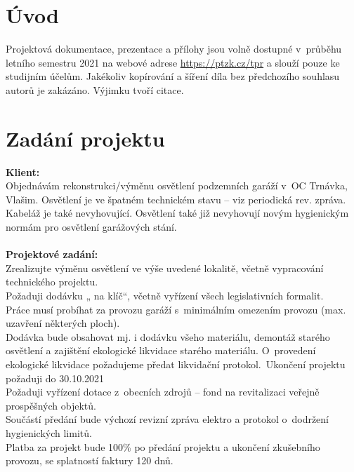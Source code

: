 \documentclass[a4paper, twoside, 11pt]{article}
\begin{document}
\newpage

\setcounter{page}{2}%

\newpage
\tableofcontents
\flushbottom %
\newpage
\vspace{0pt}
\listoffigures %
\listoftables
\flushbottom
\newpage

\setcounter{page}{1}

\section{Úvod}
	Projektová dokumentace, prezentace a přílohy jsou volně dostupné v~průběhu  letního semestru 2021 na webové adrese \url{https://ptzk.cz/tpr} a slouží pouze ke studijním účelům. Jakékoliv kopírování a šíření díla bez předchozího souhlasu autorů je zakázáno. Výjimku tvoří citace.
	
	\section{Zadání projektu}
	\textbf{Klient:}\\
		Objednávám rekonstrukci/výměnu osvětlení podzemních garáží v~OC Trnávka, Vlašim. Osvětlení je ve špatném technickém stavu – viz periodická rev. zpráva. Kabeláž je také nevyhovující. Osvětlení také již nevyhovují novým hygienickým normám pro osvětlení garážových stání.\\ \\
		
		\noindent \textbf{Projektové zadání:}\\
		\noindent Zrealizujte výměnu osvětlení ve výše uvedené lokalitě, včetně vypracování technického projektu.\\ 
		\noindent Požaduji dodávku „ na klíč“, včetně vyřízení všech legislativních formalit.\\ 
\noindent Práce musí probíhat za provozu garáží s~minimálním omezením provozu (max. uzavření některých ploch).\\ 
\noindent Dodávka bude obsahovat mj. i dodávku všeho materiálu, demontáž starého osvětlení a zajištění ekologické likvidace starého materiálu. O~provedení ekologické likvidace požadujeme předat likvidační protokol.\ 
\noindent Ukončení projektu požaduji do 30.10.2021\\ 
\noindent Požaduji vyřízení dotace z~obecních zdrojů – fond na revitalizaci veřejně prospěšných objektů.\\ 
\noindent Součástí předání bude výchozí revizní zpráva elektro a protokol o~dodržení hygienických limitů.\\ 
\noindent Platba za projekt bude 100\% po předání projektu a ukončení zkušebního provozu, se splatností faktury 120 dnů.\\ \\
\end{document}
